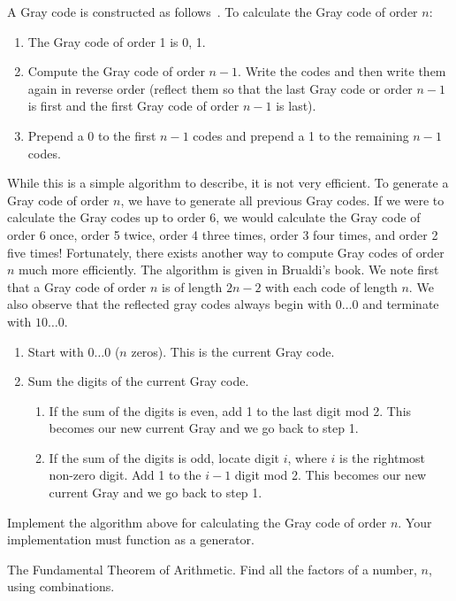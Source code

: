 A Gray code is constructed as follows~.  To calculate the Gray code of order $n$:
\begin{enumerate}
\item The Gray code of order 1 is 0, 1.
\item Compute the Gray code of order $n-1$.  Write the codes and then write them again in reverse order (reflect them so that the last Gray code or order $n-1$ is first and the first Gray code of order $n-1$ is last).
\item Prepend a 0 to the first $n-1$ codes and prepend a 1 to the remaining $n-1$ codes.
\end{enumerate}
While this is a simple algorithm to describe, it is not very efficient.  
To generate a Gray code of order $n$, we have to generate all previous Gray codes.  
If we were to calculate the Gray codes up to order 6, we would calculate the Gray code of order 6 once, order 5 twice, order 4 three times, order 3 four times, and order 2 five times!
Fortunately, there exists another way to compute Gray codes of order $n$ much more efficiently.
The algorithm is given in Brualdi's book.  
We note first that a Gray code of order $n$ is of length $2n-2$ with each code of length $n$.
We also observe that the reflected gray codes always begin with $0\dots0$ and terminate with $10\dots0$.
\begin{enumerate}
\item Start with $0\dots0$ ($n$ zeros).  This is the current Gray code.
\item Sum the digits of the current Gray code.
\begin{enumerate}
\item If the sum of the digits is even, add 1 to the last digit mod 2.
This becomes our new current Gray and we go back to step 1.
\item If the sum of the digits is odd, locate digit $i$, where $i$ is the rightmost non-zero digit.  Add 1 to the $i-1$ digit mod 2.  This becomes our new current Gray and we go back to step 1.
\end{enumerate}
\end{enumerate}

\begin{problem}
Implement the algorithm above for calculating the Gray code of order $n$.
Your implementation must function as a generator.
\end{problem}

\begin{problem}
The Fundamental Theorem of Arithmetic.
Find all the factors of a number, $n$, using combinations.
\end{problem}

